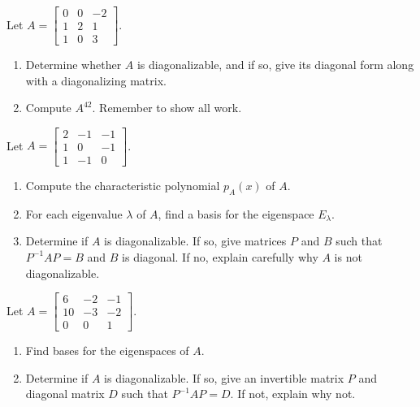\documentclass[11pt,twoside,openany]{memoir}
\begin{document}
    \begin{exercise}
    Let $A=\begin{bmatrix} 0 & 0 & -2 \\ 1 & 2 & 1 \\ 1 & 0 & 3\end{bmatrix}$.
    \begin{enumerate}[label=(\alph*)]
        \item Determine whether $A$ is diagonalizable, and if so, give its diagonal form along with a diagonalizing matrix.
        \item Compute $A^{42}$. Remember to show all work.
    \end{enumerate}
    \end{exercise}
    
    \begin{exercise}
    Let $A=\begin{bmatrix} 2 & -1 & -1 \\ 1 & 0 & -1 \\ 1 & -1 & 0\end{bmatrix}$.
    \begin{enumerate}[label=(\alph*)]
        \item Compute the characteristic polynomial $p_A(x)$ of $A$.
        \item For each eigenvalue $\lambda$ of $A$, find a basis for the eigenspace $E_{\lambda}$.
        \item Determine if $A$ is diagonalizable. If so, give matrices $P$ and $B$ such that $P^{-1}AP=B$ and $B$ is diagonal. If no, explain carefully why $A$ is not diagonalizable.
    \end{enumerate}
    \end{exercise}
    
    \begin{exercise}
    Let $A=\begin{bmatrix} 6 & -2 & -1 \\ 10 & -3 & -2 \\ 0 & 0 & 1\end{bmatrix}$.
    \begin{enumerate}[label=(\alph*)]
        \item Find bases for the eigenspaces of $A$.
        \item Determine if $A$ is diagonalizable. If so, give an invertible matrix $P$ and diagonal matrix $D$ such that $P^{-1}AP=D$. If not, explain why not.
    \end{enumerate}
    \end{exercise}
    
\end{document}
